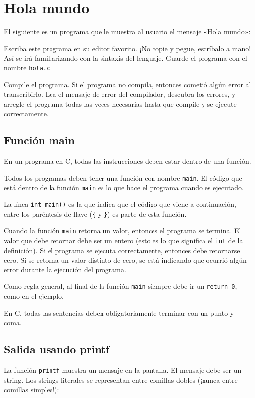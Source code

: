 \section{Hola mundo}

El siguiente es un programa que le muestra al usuario el mensaje «Hola
mundo»:

Escriba este programa en su editor favorito. ¡No copie y pegue,
escríbalo a mano! Así se irá familiarizando con la sintaxis del
lenguaje. Guarde el programa con el nombre \lstinline!hola.c!.

Compile el programa. Si el programa no compila, entonces cometió algún
error al transcribirlo. Lea el mensaje de error del compilador, descubra
los errores, y arregle el programa todas las veces necesarias hasta que
compile y se ejecute correctamente.

\subsection{Función main}

En un programa en C, todas las instrucciones deben estar dentro de una
función.

Todos los programas deben tener una función con nombre \lstinline!main!.
El código que está dentro de la función \lstinline!main! es lo que hace
el programa cuando es ejecutado.

La línea \lstinline!int main()! es la que indica que el código que viene
a continuación, entre los paréntesis de llave (\lstinline!{! y
\lstinline!}!) es parte de esta función.

Cuando la función \lstinline!main! retorna un valor, entonces el
programa se termina. El valor que debe retornar debe ser un entero (esto
es lo que significa el \lstinline!int! de la definición). Si el programa
se ejecuta correctamente, entonces debe retornarse cero. Si se retorna
un valor distinto de cero, se está indicando que ocurrió algún error
durante la ejecución del programa.

Como regla general, al final de la función \lstinline!main! siempre debe
ir un \lstinline!return 0!, como en el ejemplo.

En C, todas las sentencias deben obligatoriamente terminar con un punto
y coma.

\subsection{Salida usando printf}

La función \lstinline!printf! muestra un mensaje en la pantalla. El
mensaje debe ser un string. Los strings literales se representan entre
comillas dobles (¡nunca entre comillas simples!):

